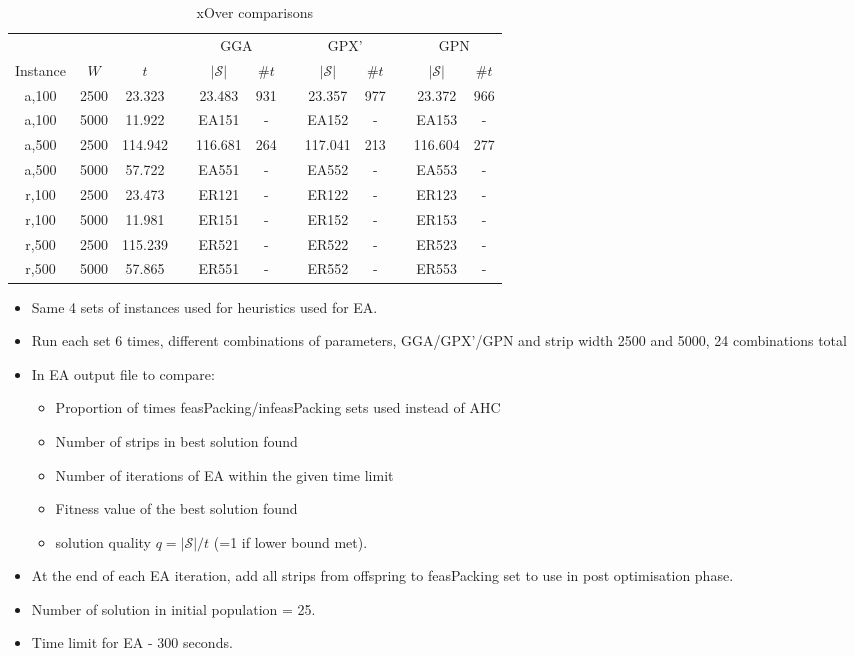 \documentclass{elsarticle}
\begin{document}
\begin{table}[h!]
	\centering
	\caption{xOver comparisons}
	\begin{tabular}{cccccccccccc}\toprule
		& & & &\multicolumn{2}{c}{GGA} &\phantom{a}& \multicolumn{2}{c}{GPX'} &\phantom{a}& \multicolumn{2}{c}{GPN}\\
		\cmidrule{5-6} \cmidrule{8-9} \cmidrule{11-12}
		Instance & $W$ & $t$ && $|\mathcal{S}|$ & $\# t$ && $|\mathcal{S}|$ & $\# t$ && $|\mathcal{S}|$ & $\# t$ \\ \midrule	
		a,100 & 2500 & 23.323 && 23.483 & 931 && 23.357 & 977 && 23.372 & 966 \\
		a,100 & 5000 & 11.922 && EA151 & - && EA152 & - && EA153 & -\\
		\midrule
		a,500 & 2500 & 114.942 && 116.681 & 264 && 117.041 & 213 && 116.604 & 277 \\
		a,500 & 5000 & 57.722 && EA551 & - && EA552 & - && EA553 & -\\
		\midrule
		\midrule
		r,100 & 2500 & 23.473 && ER121 & - && ER122 & - && ER123 & -\\
		r,100 & 5000 & 11.981 && ER151 & - && ER152 & - && ER153 & -\\
		\midrule
		r,500 & 2500 & 115.239 && ER521 & - && ER522 & - && ER523 & -\\
		r,500 & 5000 & 57.865 && ER551 & - && ER552 & - && ER553 & -\\
		\bottomrule
	\end{tabular}	
	\label{table:EA}
\end{table}

{\color{OrangeRed}
\begin{itemize}[leftmargin=*]
	\item Same 4 sets of instances used for heuristics used for EA.
	\item Run each set 6 times, different combinations of parameters, GGA/GPX'/GPN and strip width 2500 and 5000, 24 combinations total
	\item In EA output file to compare:
	\begin{itemize}[leftmargin=*]
		\item Proportion of times feasPacking/infeasPacking sets used instead of AHC
		\item Number of strips in best solution found
		\item Number of iterations of EA within the given time limit
		\item Fitness value of the best solution found
		\item solution quality $q = |\mathcal{S}|/t$ (=1 if lower bound met).
	\end{itemize}
	\item At the end of each EA iteration, add all strips from offspring to feasPacking set to use in post optimisation phase.
	\item Number of solution in initial population = 25.
	\item Time limit for EA - 300 seconds.
\end{itemize}
}
\end{document}
